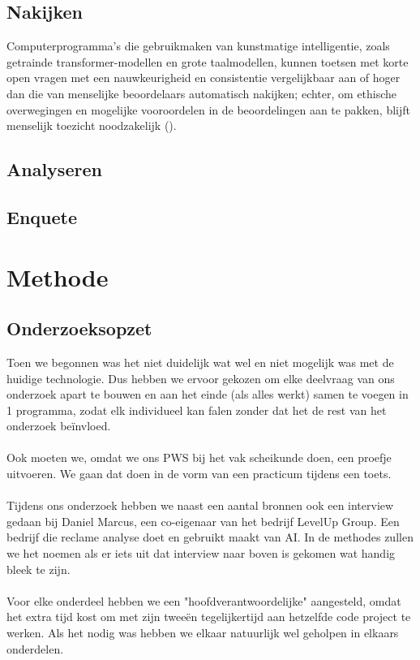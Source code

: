 \documentclass[12pt]{article}
\begin{document}
\subsection{Nakijken}
    Computerprogramma's die gebruikmaken van kunstmatige intelligentie, zoals getrainde transformer-modellen en grote taalmodellen, kunnen toetsen met korte open vragen met een nauwkeurigheid en consistentie vergelijkbaar aan of hoger dan die van menselijke beoordelaars automatisch nakijken; echter, om ethische overwegingen en mogelijke vooroordelen in de beoordelingen aan te pakken, blijft menselijk toezicht noodzakelijk (\cite{gobrecht2024humansubjectivityerrornovel, kumar2020scoredusingautosas, schneider2024llmbasedautogradingshorttextual}).
\subsection{Analyseren}

\subsection{Enquete}
\pagebreak

\section{Methode}
\subsection{Onderzoeksopzet}
\begin{multicols}{2}
Toen we begonnen was het niet duidelijk wat wel en niet mogelijk was met de huidige technologie. Dus hebben we ervoor gekozen om elke deelvraag van ons onderzoek apart te bouwen en aan het einde (als alles werkt) samen te voegen in 1 programma, zodat elk individueel kan falen zonder dat het de rest van het onderzoek beïnvloed.
\\\\
Ook moeten we, omdat we ons PWS bij het vak scheikunde doen, een proefje uitvoeren. We gaan dat doen in de vorm van een practicum tijdens een toets.
\\\\
Tijdens ons onderzoek hebben we naast een aantal bronnen ook een interview gedaan bij Daniel Marcus, een co-eigenaar van het bedrijf LevelUp Group. Een bedrijf die reclame analyse doet en gebruikt maakt van AI. In de methodes zullen we het noemen als er iets uit dat interview naar boven is gekomen wat handig bleek te zijn.
\\\\
Voor elke onderdeel hebben we een "hoofdverantwoordelijke" aangesteld, omdat het extra tijd kost om met zijn tweeën tegelijkertijd aan hetzelfde code project te werken. Als het nodig was hebben we elkaar natuurlijk wel geholpen in elkaars onderdelen.
\end{multicols}
\end{document}
